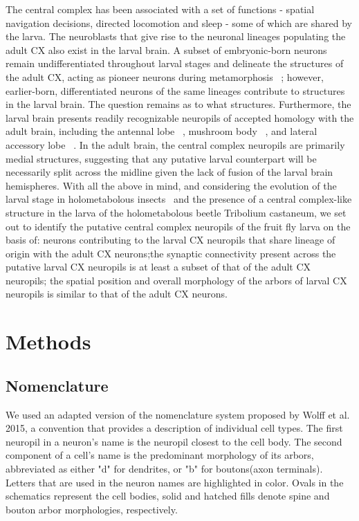 \documentclass{article}
\begin{document}
The central complex has been associated with a set of functions - spatial navigation decisions, directed locomotion and sleep - some of which are shared by the larva. The neuroblasts that give rise to the neuronal lineages populating the adult CX also exist in the larval brain. A subset of embryonic-born neurons remain undifferentiated throughout larval stages and delineate the structures of the adult CX, acting as pioneer neurons during metamorphosis 
~\citep{andrade2019developmentally}; however, earlier-born, differentiated neurons of the same lineages contribute to structures in the larval brain. The question remains as to what structures. Furthermore, the larval brain presents readily recognizable neuropils of accepted homology with the adult brain, including the antennal lobe ~\citep{berck2016wiring}, mushroom body ~\citep{eichler2017complete}, and lateral accessory lobe ~\citep{hartenstein2015lineage}.
 In the adult brain, the central complex neuropils are primarily medial structures, suggesting that any putative larval counterpart will be necessarily split across the midline given the lack of fusion of the larval brain hemispheres. With all the above in mind, and considering the evolution of the larval stage in holometabolous insects ~\citep{truman1999origins}and the presence of a central complex-like structure in the larva of the holometabolous beetle Tribolium castaneum, we set out to identify the putative central complex neuropils of the fruit fly larva on the basis of: neurons contributing to the larval CX neuropils that share lineage of origin with the adult CX neurons;the synaptic connectivity present across the putative larval CX neuropils is at least a subset of that of the adult CX neuropils; the spatial position and overall morphology of the arbors of larval CX neuropils is similar to that of the adult CX neurons. 


\section{Methods}
 \subsection{Nomenclature}
 We used an adapted version of the nomenclature system proposed by Wolff et al. 2015, a convention that provides a description of individual cell types. The first neuropil in a neuron’s name is the neuropil closest to the cell body. The second component of a cell’s name is the predominant morphology of its arbors, abbreviated as either "d" for dendrites, or "b" for boutons(axon terminals). Letters that are used in the neuron names are highlighted in color. Ovals in the schematics represent the cell bodies, solid and hatched fills denote spine and bouton arbor morphologies, respectively.
 
\end{document}
